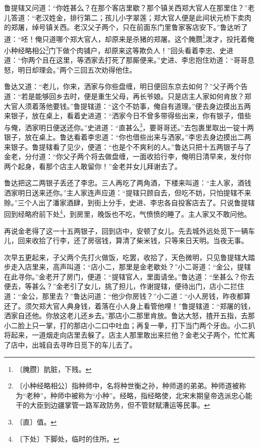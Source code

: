 \documentclass[12pt,UTF-8,openany]{ctexbook}
\begin{document}
\begin{normalsize}
    鲁提辖又问道：“你姓甚么？在那个客店里歇？那个镇关西郑大官人在那里住？”老儿答道：“老汉姓金，排行第二；孩儿小字翠莲；郑大官人便是此间状元桥下卖肉的郑屠，绰号镇关西。老汉父子两个，只在前面东门里鲁家客店安下。”鲁达听了道：“呸！俺只道哪个郑大官人，却原来是杀猪的郑屠。这个腌臜\footnote{〔腌臜〕肮脏，下贱。}泼才，投托着俺小种经略相公\footnote{〔小种经略相公〕指种师中，名将种世衡之孙，种师道的弟弟。种师道被称为“老种”，种师中被称为“小种”。经略，指经略使，北宋末期皇帝选派忠心能干的大臣到边疆掌管一路军政防务，但不管财赋漕运等民事。}门下做个肉铺户，却原来这等欺负人！”回头看着李忠、史进道：“你两个且在这里，等洒家去打死了那厮便来。”史进、李忠抱住劝道：“哥哥息怒，明日却理会。”两个三回五次劝得他住。
    
    鲁达又道：“老儿，你来，洒家与你些盘缠，明日便回东京去如何？”父子两个告道：“若是能够回乡去时，便是重生父母，再长爷娘。只是店主人家如何肯放？郑大官人须着落他要钱。”鲁提辖道：“这个不妨事，俺自有道理。”便去身边摸出五两来银子，放在桌上，看着史进道：“洒家今日不曾多带得些出来，你有银子，借些与俺，洒家明日便送还你。”史进道：“直甚么\footnote{〔直〕值。}，要哥哥还。”去包裹里取出一锭十两银子，放在桌上。鲁达看着李忠道：“你也借些出来与洒家。”李忠去身边摸出二两来银子。鲁提辖看了见少，便道：“也是个不爽利的人。”鲁达只把十五两银子与了金老，分付道：“你父子两个将去做盘缠，一面收拾行李，俺明日清早来，发付你两个起身，看那个店主人敢留你！”金老并女儿拜谢去了。
    
    鲁达把这二两银子丢还了李忠。三人再吃了两角酒，下楼来叫道：“主人家，酒钱洒家明日送来还你。”主人家连声应道：“提辖只顾自去，但吃不妨，只怕提辖不来赊。”三个人出了潘家酒肆，到街上分手，史进、李忠各自投客店去了。只说鲁提辖回到经略府前下处\footnote{〔下处〕下脚处，临时的住所。}，到房里，晚饭也不吃，气愤愤的睡了。主人家又不敢问他。
    
    再说金老得了这一十五两银子，回到店中，安顿了女儿。先去城外远处觅下一辆车儿，回来收拾了行李，还了房宿钱，算清了柴米钱，只等来日天明。当夜无事。
    
    次早五更起来，子父两个先打火做饭，吃罢，收拾了，天色微明，只见鲁提辖大踏步走入店里来，高声叫道：“店小二，那里是金老歇处？”小二哥道：“金公，提辖在此寻你。”金老开了房门，便道：“提辖官人，里面请坐。”鲁达道：“坐甚么？你去便去，等甚么？”金老引了女儿，挑了担儿，作谢提辖，便待出门，店小二拦住道：“金公，那里去？”鲁达问道：“他少你房钱？”小二道：“小人房钱，昨夜都算还了。须欠郑大官人典身钱，着落在小人身上看管他哩！”鲁提辖道：“郑屠的钱，洒家自还他。你放这老儿还乡去。”那店小二那里肯放。鲁达大怒，揸开五指，去那小二脸上只一掌，打的那店小二口中吐血；再复一拳，打下当门两个牙齿。小二扒将起来，一道烟走向店里去躲了。店主人那里敢出来拦他？金老父子两个，忙忙离了店中，出城自去寻昨日觅下的车儿去了。
    

\end{normalsize}
\end{document}
